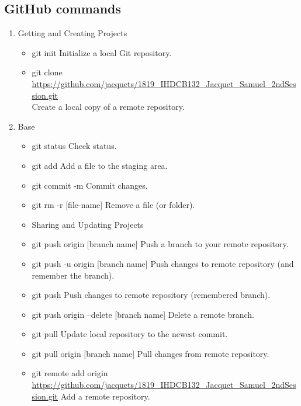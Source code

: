 \documentclass[12pt]{article}
\begin{document}
\subsection{GitHub commands}
\begin{enumerate}
\item Getting and Creating Projects
\begin{itemize} [label=\textbullet, font=\small \color{blue}]
\item git init \tabto{8cm} Initialize a local Git repository.
\item git clone \url{https://github.com/jacquets/1819_IHDCB132_Jacquet_Samuel_2ndSession.git} \\Create a local copy of a remote repository.
\end{itemize}

\item Base
\begin{itemize} [label=\textbullet, font=\small \color{blue}]
\item git status \tabto{8cm} Check status.
\item git add \tabto{8cm} Add a file to the staging area.
\item git commit -m \fg \tabto{8cm} Commit changes.
\item git rm -r [file-name] \tabto{8cm} Remove a file (or folder).
\item Sharing and Updating Projects
\item git push origin [branch name] \tabto{8cm} Push a branch to your remote repository.
\item git push -u origin [branch name] \tabto{8cm} Push changes to remote repository (and remember the branch).
\item git push \tabto{8cm} Push changes to remote repository (remembered branch).
\item git push origin --delete [branch name] \tabto{8cm} Delete a remote branch.
\item git pull \tabto{8cm} Update local repository to the newest commit.
\item git pull origin [branch name] \tabto{8cm} Pull changes from remote repository.
\item git remote add origin \url{https://github.com/jacquets/1819_IHDCB132_Jacquet_Samuel_2ndSession.git} \tabto{8cm} Add a remote repository.
\end{itemize}


\end{enumerate}
\end{document}

